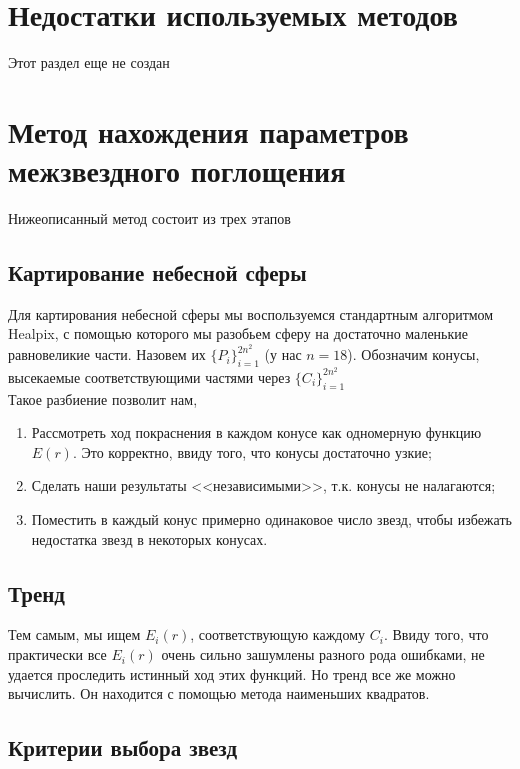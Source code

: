 \documentclass[14pt]{article}
\begin{document}
    \section{Недостатки используемых методов}
        Этот раздел еще не создан
        
    \section{Метод нахождения параметров межзвездного поглощения}
    
        Нижеописанный метод состоит из трех этапов
    
        \subsection{Картирование небесной сферы}
            Для картирования небесной сферы мы воспользуемся стандартным алгоритмом Healpix, с помощью которого мы разобьем сферу на достаточно маленькие равновеликие части. Назовем их $\{P_i\}_{i = 1}^{2n^2}$ (у нас $n = 18$). Обозначим конусы, высекаемые соответствующими частями через $\{C_i\}_{i = 1}^{2n^2}$\\
        
            Такое разбиение позволит нам,
            \begin{enumerate}
                \item Рассмотреть ход покраснения в каждом конусе как одномерную функцию $E(r)$. Это корректно, ввиду того, что конусы достаточно узкие;
                \item Сделать наши результаты <<независимыми>>, т.к. конусы не налагаются;
                \item Поместить в каждый конус примерно одинаковое число звезд, чтобы избежать недостатка звезд в некоторых конусах.  
            \end{enumerate}      
            
        \subsection{Тренд}
            Тем самым, мы ищем $E_i(r)$, соответствующую каждому $C_i$. Ввиду того, что практически все $E_i(r)$ очень сильно зашумлены разного рода ошибками, не удается проследить истинный ход этих функций. Но тренд все же можно вычислить. Он находится с помощью метода наименьших квадратов.  
            
        \subsection{Критерии выбора звезд}
\end{document}
